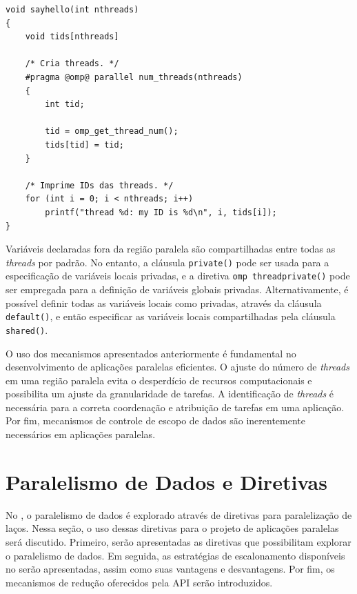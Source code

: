 \documentclass{SBCbookchapter}
\begin{document}
\begin{lstlisting}[frame=single,float,floatplacement=t,caption=Um exemplo simples com uma região paralela.,label=listing:sayhello]
void sayhello(int nthreads)
{
	void tids[nthreads]

	/* Cria threads. */
	#pragma @omp@ parallel num_threads(nthreads)
	{
		int tid;

		tid = omp_get_thread_num();
		tids[tid] = tid;
	}

	/* Imprime IDs das threads. */
	for (int i = 0; i < nthreads; i++)
		printf("thread %d: my ID is %d\n", i, tids[i]);
}
\end{lstlisting}

		Variáveis declaradas fora da região paralela são compartilhadas
		entre todas as \textit{threads} por padrão. No entanto, a
		cláusula \texttt{private()} pode ser usada para a especificação
		de variáveis locais privadas, e a diretiva \texttt{omp
		threadprivate()} pode ser empregada para a definição de
		variáveis globais privadas. Alternativamente, é possível definir todas as
		variáveis locais como privadas, através da cláusula
		\texttt{default()}, e então especificar as variáveis locais
		compartilhadas pela cláusula \texttt{shared()}.

		O uso dos mecanismos apresentados anteriormente é fundamental no
		desenvolvimento de aplicações paralelas eficientes. O ajuste do
		número de \textit{threads} em uma região paralela evita o
		desperdício de recursos computacionais e possibilita um ajuste
		da granularidade de tarefas. A identificação de \textit{threads}
		é necessária para a correta coordenação e atribuição de tarefas
		em uma aplicação. Por fim, mecanismos de controle de escopo de
		dados são inerentemente necessários em aplicações paralelas.

\section{Paralelismo de Dados e Diretivas \openmp}
\label{sec:paralelismo dados}

	No \openmp, o paralelismo de dados é explorado através de diretivas
	para paralelização de laços. Nessa seção, o uso dessas diretivas
	para o projeto de aplicações paralelas será discutido.  Primeiro,
	serão apresentadas as diretivas que possibilitam explorar o
	paralelismo de dados. Em seguida, as estratégias de escalonamento
	disponíveis no \openmp serão apresentadas, assim como suas vantagens e
	desvantagens. Por fim, os mecanismos de redução oferecidos pela API
	\openmp serão introduzidos.
\end{document}

